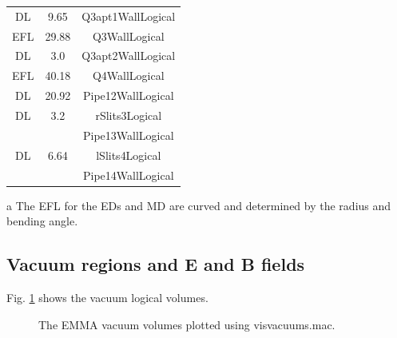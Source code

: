 \documentclass[letter,11pt]{article}
\begin{document}
\begin{table}
\begin{threeparttable}
\begin{tabular}{ccc}
DL	&9.65	&Q3apt1WallLogical\\
EFL	&29.88	&Q3WallLogical\\
DL	&3.0		&Q3apt2WallLogical\\
EFL	&40.18	&Q4WallLogical\\
DL	&20.92	&Pipe12WallLogical\\
DL	&3.2	&rSlits3Logical\\
	&		&Pipe13WallLogical\\
DL	&6.64	&lSlits4Logical\\
	&		&Pipe14WallLogical\\
\hline
\end{tabular}
     \begin{tablenotes}
       \item[a] {\small The EFL for the EDs and MD are curved and determined by the radius and bending angle.}
     \end{tablenotes}
\end{threeparttable}
\end{table}

\newpage
\subsection{Vacuum regions and E and B fields}

Fig. \ref{fig:vac} shows the vacuum logical volumes.

\begin{figure}
\centering
	\caption{The EMMA vacuum volumes plotted using visvacuums.mac.}
	\label{fig:vac}
\end{figure}
\end{document}
